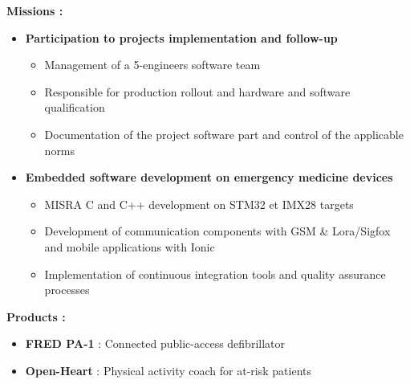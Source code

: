 {\begin{itemize}[leftmargin=\ListItemsMargins]
	\end{itemize}
\else
	\textcolor{color1}{\textbf{Missions :}}
	\begin{itemize}[leftmargin=\ListItemsMargins]
		\item \textbf{Participation to projects implementation and follow-up}
		\begin{itemize}
			\item Management of a 5-engineers software team
			\item Responsible for production rollout and hardware and software qualification
			\item Documentation of the project software part and control of the applicable norms
		\end{itemize}
		\item \textbf{Embedded software development on emergency medicine devices}
		\begin{itemize}
			\item MISRA C and C++ development on STM32 et IMX28 targets
			\item Development of communication components with GSM \& Lora/Sigfox and mobile applications with Ionic
			\item Implementation of continuous integration tools and quality assurance processes
		\end{itemize}
	\end{itemize}
	\textcolor{color1}{\textbf{Products :}}
	\begin{itemize}[leftmargin=\ListItemsMargins]
		\item \textbf{FRED PA-1} : Connected public-access defibrillator \textcolor{color1}{\href{http://www.schiller.ch/corp/en/product/fred-pa-1}{\ExternalLink}}
		\item \textbf{Open-Heart} : Physical activity coach for at-risk patients \textcolor{color1}{\href{http://www.schiller.ch/corp/en/schiller-cutting-edge-connected-health}{\ExternalLink}}
	\end{itemize}
\fi
}



\vspace{\ItemsMaxSpacing}

